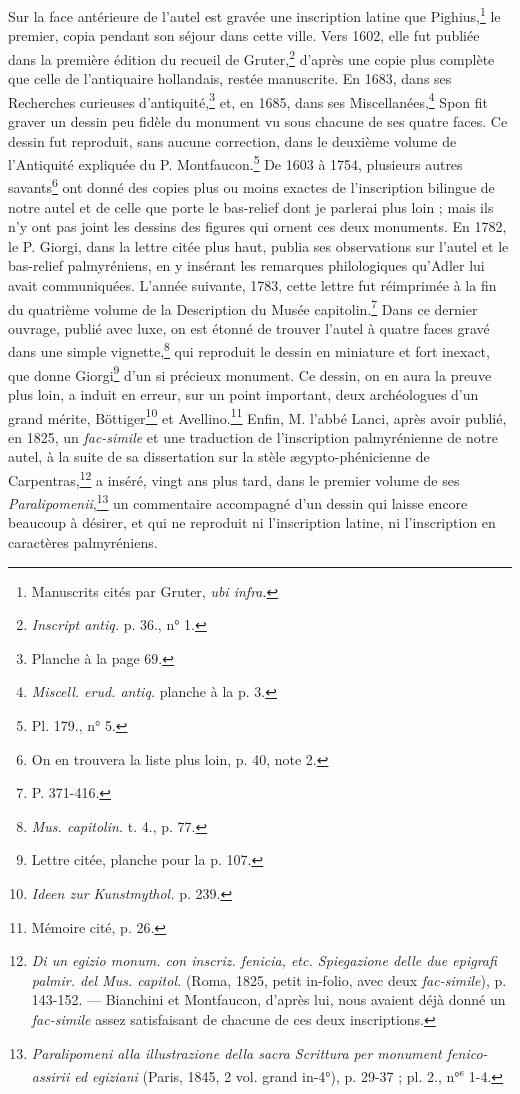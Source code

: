 \documentclass{article}
\begin{document}
Sur la face antérieure de l'autel est gravée une inscription latine que Pighius,\footnote{Manuscrits cités par Gruter, \emph{ubi infra}.} le premier, copia pendant son séjour dans cette ville. Vers 1602, elle fut publiée dans la première édition du recueil de Gruter,\footnote{\emph{Inscript antiq.} p. 36., n° 1.} d'après une copie plus complète que celle de l'antiquaire hollandais, restée manuscrite. En 1683, dans ses Recherches curieuses d'antiquité,\footnote{Planche à la page 69.} et, en 1685, dans ses Miscellanées,\footnote{\emph{Miscell. erud. antiq.} planche à la p. 3.} Spon fit graver un dessin peu fidèle du monument vu sous chacune de ses quatre faces. Ce dessin fut reproduit, sans aucune correction, dans le deuxième volume de l'Antiquité expliquée du P. Montfaucon.\footnote{Pl. 179., n° 5.} De 1603 à 1754, plusieurs autres savants\footnote{On en trouvera la liste plus loin, p. 40, note 2.} ont donné des copies plus ou moins exactes de l'inscription bilingue de notre autel et de celle que porte le bas-relief dont je parlerai plus loin ; mais ils n'y ont pas joint les dessins des figures qui ornent ces deux monuments. En 1782, le P. Giorgi, dans la lettre citée plus haut, publia ses observations sur l'autel et le bas-relief palmyréniens, en y insérant les remarques philologiques qu'Adler lui avait communiquées. L'année suivante, 1783, cette lettre fut réimprimée à la fin du quatrième volume de la Description du Musée capitolin.\footnote{P. 371-416.} Dans ce dernier ouvrage, publié avec luxe, on est étonné de trouver l'autel à quatre faces gravé dans une simple vignette,\footnote{\emph{Mus. capitolin.} t. 4., p. 77.} qui reproduit le dessin en miniature et fort inexact, que donne Giorgi\footnote{Lettre citée, planche pour la p. 107.} d'un si précieux monument. Ce dessin, on en aura la preuve plus loin, a induit en erreur, sur un point important, deux archéologues d'un grand mérite, Böttiger\footnote{\emph{Ideen zur Kunstmythol.} p. 239.} et Avellino.\footnote{Mémoire cité, p. 26.} Enfin, M. l'abbé Lanci, après avoir publié, en 1825, un \emph{fac-simile} et une traduction de l'inscription palmyrénienne de notre autel, à la suite de sa dissertation sur la stèle ægypto-phénicienne de Carpentras,\footnote{\emph{Di un egizio monum. con inscriz. fenicia, etc. Spiegazione delle due epigrafi palmir. del Mus. capitol.} (Roma, 1825, petit in-folio, avec deux \emph{fac-simile}), p. 143-152. --- Bianchini et Montfaucon, d'après lui, nous avaient déjà donné un \emph{fac-simile} assez satisfaisant de chacune de ces deux inscriptions.} a inséré, vingt ans plus tard, dans le premier volume de ses \emph{Paralipomenii},\footnote{\emph{Paralipomeni alla illustrazione della sacra Scrittura per monument fenico-assirii ed egiziani} (Paris, 1845, 2 vol. grand in-4°), p. 29-37 ; pl. 2., n°\textsuperscript{s} 1-4.} un commentaire accompagné d'un dessin qui laisse encore beaucoup à désirer, et qui ne reproduit ni l'inscription latine, ni l'inscription en caractères palmyréniens.
\end{document}

